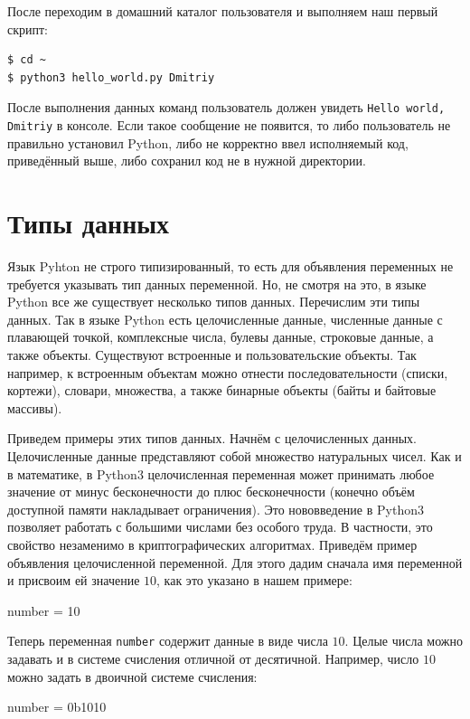 После переходим в домашний каталог пользователя и выполняем наш первый скрипт:

\begin{verbatim}
$ cd ~
$ python3 hello_world.py Dmitriy
\end{verbatim}

После выполнения данных команд пользователь должен увидеть
\texttt{Hello world, Dmitriy} в консоле. Если такое сообщение не 
появится, то либо пользователь не правильно установил Python,
либо не корректно ввел исполняемый код, приведённый выше,
либо сохранил код не в нужной директории.

\section{Типы данных}

Язык Pyhton не строго типизированный, то есть для объявления
переменных не требуется указывать тип данных переменной. Но, не смотря на
это, в языке Python все же существует несколько типов данных.
Перечислим эти типы данных. Так в языке Python есть целочисленные данные,
численные данные с плавающей точкой, комплексные числа, булевы данные, строковые данные, а 
также объекты. Существуют встроенные и пользовательские объекты. Так например, к
встроенным объектам можно отнести последовательности (списки, кортежи), 
словари, множества, а также бинарные объекты (байты и байтовые массивы).

Приведем примеры этих типов данных. Начнём с целочисленных данных. 
Целочисленные данные представляют собой множество натуральных чисел. Как и в 
математике, в Python3 целочисленная переменная может принимать любое значение 
от минус бесконечности до плюс бесконечности (конечно объём доступной памяти
накладывает ограничения). Это нововведение в Python3 позволяет 
работать с большими числами без особого труда. В частности, это свойство незаменимо 
в криптографических алгоритмах. Приведём пример объявления целочисленной переменной. 
Для этого дадим сначала имя переменной и присвоим ей значение $10$, как это указано 
в нашем примере:

\begin{python}
number = 10
\end{python}

Теперь переменная \texttt{number} содержит данные в виде числа $10$. Целые числа
можно задавать и в системе счисления отличной от десятичной. Например, число $10$ можно задать
в двоичной системе счисления:

\begin{python}
number = 0b1010
\end{python}

